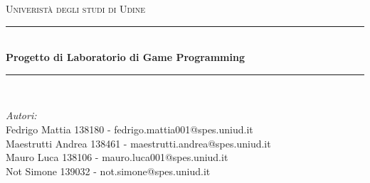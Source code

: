 \documentclass[15pt]{article}
\begin{document}
\begin{titlepage}

\newcommand{\HRule}{\rule{\linewidth}{0.5mm}} %

\center %
 

\textsc{\LARGE Univeristà degli studi di Udine}\\[1.5cm] %


\HRule \\[0.4cm]
{ \huge \bfseries Progetto di Laboratorio di Game Programming}\\[0.4cm] %
\HRule \\[1.5cm]
 

\begin{minipage}{1\textwidth}
\begin{flushleft} \large
\emph{Autori:}\\
Fedrigo Mattia 138180 - fedrigo.mattia001@spes.uniud.it\\
Maestrutti Andrea 138461 - maestrutti.andrea@spes.uniud.it\\
Mauro Luca 138106 - mauro.luca001@spes.uniud.it\\
Not Simone 139032 - not.simone@spes.uniud.it\\

\end{flushleft}
\end{minipage}
~
\begin{minipage}{0.4\textwidth}

\end{minipage}\\[2cm]



\end{titlepage}
\end{document}
